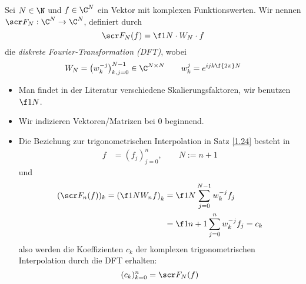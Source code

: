 \documentclass[11pt]{scrbook}
\begin{document}
\begin{df} \label{1.26}
	Sei $N\in \N$ und $f\in \C^N$ ein Vektor mit komplexen Funktionswerten.
	Wir nennen $\scr F_N: \C^N \to \C^N$, definiert durch
	\[
		\scr F_N(f) = \f 1N \cdot W_N \cdot f
	\]
	die \emph{diskrete Fourier-Transformation (DFT)}, wobei
	\[
		W_N = \big(w_{k}^{-j}\big)_{k,j=0}^{N-1} \in \C^{N\times N} \qquad w_{k}^j = e^{ijk \f {2\pi}N}
	\]
	\begin{note}
		\begin{itemize}
			\item
				Man findet in der Literatur verschiedene Skalierungsfaktoren, wir benutzen $\f 1N$.
			\item
				Wir indizieren Vektoren/Matrizen bei $0$ beginnend.		
			\item
				Die Beziehung zur trigonometrischen Interpolation in Satz \ref{1.24} besteht in
				\begin{align*}
					f &= (f_j)_{j=0}^n, \qquad N:= n+1
				\end{align*}
				und
				\begin{align*}
					(\scr F_n(f))_k = \left( \f 1N W_n f\right)_k &= \f 1N \sum_{j=0}^{N-1}w_k^{-j} f_j \\
					&= \f 1{n+1} \sum_{j=0}^{n}w_k^{-j} f_j = c_k
				\end{align*}
				also werden die Koeffizienten $c_k$ der komplexen trigonometrischen Interpolation durch die DFT erhalten:
				\[
					(c_k)_{k=0}^n = \scr F_N(f)
				\]
		\end{itemize}
	\end{note}
\end{df}
\end{document}
